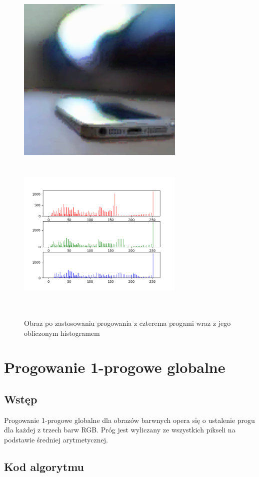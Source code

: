 \documentclass[a4paper,12pt]{book}
\begin{document}
\begin{figure}[H]	
	\caption{Obraz po zastosowaniu progowania z czterema progami wraz z jego obliczonym histogramem}
	\includegraphics[width=8cm, height=8cm]{6-5/multi-local-threshold-image-phone-4.png}
	\includegraphics[width=8cm, height=8cm]{6-5/multi-local-threshold-phone-4.png}
\end{figure}

\section{Progowanie 1-progowe globalne}
\subsection*{Wstęp}
Progowanie 1-progowe globalne dla obrazów barwnych opera się o ustalenie progu dla każdej z trzech barw RGB. Próg jest wyliczany ze wszystkich pikseli na podstawie średniej arytmetycznej. 

\subsection*{Kod algorytmu}
\end{document}
